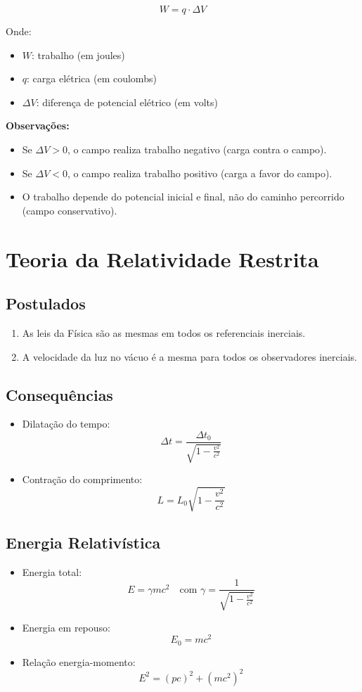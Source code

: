 \documentclass[a4paper,12pt]{article}
\begin{document}
\begin{multicols}{2}
\[
W = q \cdot \Delta V
\]

Onde:
\begin{itemize}
  \item \( W \): trabalho (em joules)
  \item \( q \): carga elétrica (em coulombs)
  \item \( \Delta V \): diferença de potencial elétrico (em volts)
\end{itemize}

\textbf{Observações:}
\begin{itemize}
  \item Se \( \Delta V > 0 \), o campo realiza trabalho negativo (carga contra o campo).
  \item Se \( \Delta V < 0 \), o campo realiza trabalho positivo (carga a favor do campo).
  \item O trabalho depende do potencial inicial e final, não do caminho percorrido (campo conservativo).
\end{itemize}

\section{Teoria da Relatividade Restrita}
\subsection{Postulados}
\begin{enumerate}
    \item As leis da Física são as mesmas em todos os referenciais inerciais.
    \item A velocidade da luz no vácuo é a mesma para todos os observadores inerciais.
\end{enumerate}

\subsection{Consequências}
\begin{itemize}
    \item Dilatação do tempo:
    \[
        \Delta t = \frac{\Delta t_0}{\sqrt{1 - \frac{v^2}{c^2}}}
    \]
    \item Contração do comprimento:
    \[
        L = L_0 \sqrt{1 - \frac{v^2}{c^2}}
    \]
\end{itemize}

\subsection{Energia Relativística}
\begin{itemize}
    \item Energia total:
    \[
        E = \gamma m c^2
    \quad \text{com } \gamma = \frac{1}{\sqrt{1 - \frac{v^2}{c^2}}}
    \]
    \item Energia em repouso:
    \[
        E_0 = m c^2
    \]
    \item Relação energia-momento:
    \[
        E^2 = (pc)^2 + (m c^2)^2
    \]
\end{itemize}


\end{multicols}
\end{document}
